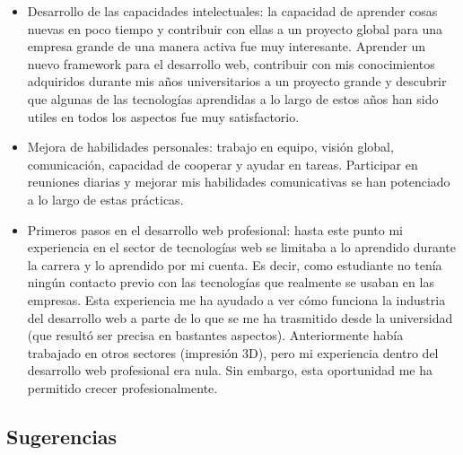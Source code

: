 \documentclass[a4paper,12pt]{article}
\begin{document}
\begin{itemize}
\item Desarrollo de las capacidades intelectuales: la capacidad de aprender cosas nuevas en poco tiempo y contribuir con ellas a un proyecto global para una empresa grande de una manera activa fue muy interesante. Aprender un nuevo framework para el desarrollo web, contribuir con mis conocimientos adquiridos durante mis años universitarios a un proyecto grande y descubrir que algunas de las tecnologías aprendidas a lo largo de estos años han sido utiles en todos los aspectos fue muy satisfactorio.

\item Mejora de habilidades personales: trabajo en equipo, visión global, comunicación, capacidad de cooperar y ayudar en tareas. Participar en reuniones diarias y mejorar mis habilidades comunicativas se han potenciado a lo largo de estas prácticas. 

\item Primeros pasos en el desarrollo web profesional: hasta este punto mi experiencia en el sector de tecnologías web se limitaba a lo aprendido durante la carrera y lo aprendido por mi cuenta. Es decir, como estudiante no tenía ningún contacto previo con las tecnologías que realmente se usaban en las empresas. Esta experiencia me ha ayudado a ver cómo funciona la industria del desarrollo web a parte de lo que se me ha trasmitido desde la universidad (que resultó ser precisa en bastantes aspectos). Anteriormente había trabajado en otros sectores (impresión 3D), pero mi experiencia dentro del desarrollo web profesional era nula. Sin embargo, esta oportunidad me ha permitido crecer profesionalmente.
\end{itemize}

\newpage


\subsection{Sugerencias}
\end{document}
